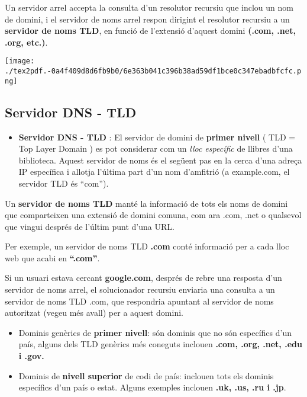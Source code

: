 \documentclass[]{article}
\providecommand{\tightlist}{%
  \setlength{\itemsep}{0pt}\setlength{\parskip}{0pt}}
\begin{document}
Un servidor arrel accepta la consulta d'un resolutor recursiu que inclou
un nom de domini, i el servidor de noms arrel respon dirigint el
resolutor recursiu a un \textbf{servidor de noms TLD}, en funció de
l'extensió d'aquest domini \textbf{(.com, .net, .org, etc.)}.

\texttt{[image: ./tex2pdf.-0a4f409d8d6fb9b0/6e363b041c396b38ad59df1bce0c347ebadbfcfc.png]}

\hypertarget{servidor-dns---tld}{%
\subsection{\texorpdfstring{\textbf{Servidor DNS -
TLD}}{Servidor DNS - TLD}}\label{servidor-dns---tld}}

\begin{itemize}
\tightlist
\item
  \textbf{Servidor DNS - TLD} : El servidor de domini de \textbf{primer
  nivell} ( TLD = Top Layer Domain ) es pot considerar com un \emph{lloc
  específic} de llibres d'una biblioteca. Aquest servidor de noms és el
  següent pas en la cerca d'una adreça IP específica i allotja l'última
  part d'un nom d'amfitrió (a example.com, el servidor TLD és ``com'').
\end{itemize}

Un \textbf{servidor de noms TLD} manté la informació de tots els noms de
domini que comparteixen una extensió de domini comuna, com ara .com,
.net o qualsevol que vingui després de l'últim punt d'una URL.

Per exemple, un servidor de noms TLD \textbf{.com} conté informació per
a cada lloc web que acabi en \textbf{``.com''}.

Si un usuari estava cercant \textbf{google.com}, després de rebre una
resposta d'un servidor de noms arrel, el solucionador recursiu enviaria
una consulta a un servidor de noms TLD .com, que respondria apuntant al
servidor de noms autoritzat (vegeu més avall) per a aquest domini.

\begin{itemize}
\item
  Dominis genèrics de \textbf{primer nivell}: són dominis que no són
  específics d'un país, alguns dels TLD genèrics més coneguts inclouen
  \textbf{.com, .org, .net, .edu i .gov.}
\item
  Dominis de \textbf{nivell superior} de codi de país: inclouen tots els
  dominis específics d'un país o estat. Alguns exemples inclouen
  \textbf{.uk, .us, .ru i .jp}.
\end{itemize}
\end{document}
